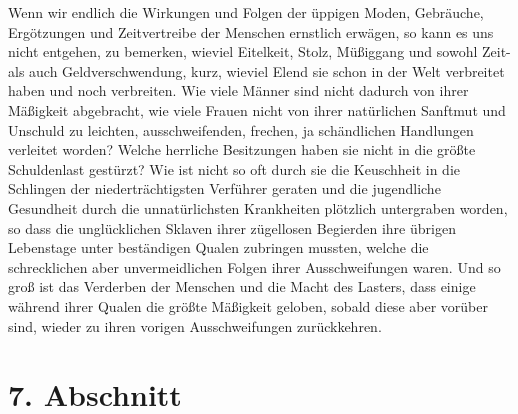 Wenn wir endlich die Wirkungen und Folgen der üppigen Moden, Gebräuche,
Ergötzungen und Zeitvertreibe der Menschen ernstlich erwägen, so kann es uns
nicht entgehen, zu bemerken, wieviel Eitelkeit, Stolz, Müßiggang und sowohl
Zeit- als auch Geldverschwendung, kurz, wieviel Elend sie schon in der Welt
verbreitet haben und noch verbreiten. Wie viele Männer sind nicht dadurch von
ihrer Mäßigkeit abgebracht, wie viele Frauen nicht von ihrer natürlichen
Sanftmut und Unschuld zu leichten, ausschweifenden, frechen, ja schändlichen
Handlungen verleitet worden? Welche herrliche Besitzungen haben sie nicht in die
größte Schuldenlast gestürzt? Wie ist nicht so oft durch sie die Keuschheit in
die Schlingen der niederträchtigsten Verführer geraten und die jugendliche
Gesundheit durch die unnatürlichsten Krankheiten plötzlich untergraben worden,
so dass die unglücklichen Sklaven ihrer zügellosen
Begierden ihre
übrigen
Lebenstage unter beständigen Qualen zubringen mussten, welche die schrecklichen
aber unvermeidlichen Folgen ihrer Ausschweifungen waren. Und so groß ist das
Verderben der Menschen und die Macht des Lasters, dass einige während ihrer
Qualen die größte Mäßigkeit geloben, sobald diese aber vorüber sind, wieder zu
ihren vorigen Ausschweifungen zurückkehren.

\section{7. Abschnitt} \label{kap18_ab7}

